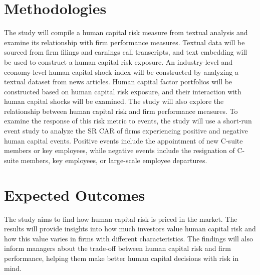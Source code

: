 \documentclass[a4paper, 10pt, authoryear]{elsarticle}
\begin{document}
\section{Methodologies}
The study will compile a human capital risk measure from textual analysis and examine its relationship with firm performance measures. Textual data will be sourced from firm filings and earnings call transcripts, and text embedding will be used to construct a human capital risk exposure. An industry-level and economy-level human capital shock index will be constructed by analyzing a textual dataset from news articles. Human capital factor portfolios will be constructed based on human capital risk exposure, and their interaction with human capital shocks will be examined. The study will also explore the relationship between human capital risk and firm performance measures.
\newline
To examine the response of this risk metric to events, the study will use a short-run event study to analyze the SR CAR of firms experiencing positive and negative human capital events. Positive events include the appointment of new C-suite members or key employees, while negative events include the resignation of C-suite members, key employees, or large-scale employee departures.

\section{Expected Outcomes}
The study aims to find how human capital risk is priced in the market. The results will provide insights into how much investors value human capital risk and how this value varies in firms with different characteristics. The findings will also inform managers about the trade-off between human capital risk and firm performance, helping them make better human capital decisions with risk in mind.

\pagebreak


\end{document}
